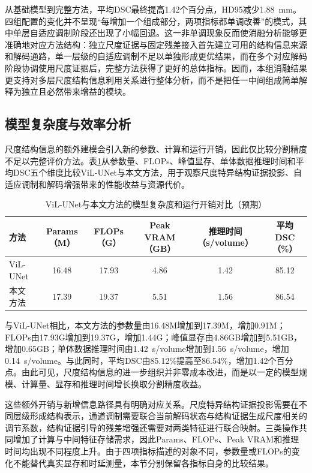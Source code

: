 从基础模型到完整方法，平均DSC最终提高1.42个百分点，HD95减少1.88~mm。四组配置的变化并不呈现“每增加一个组成部分，两项指标都单调改善”的模式，其中单层自适应调制阶段还出现了小幅回退。这一非单调现象反而使消融分析能够更准确地对应方法结构：独立尺度证据与固定残差接入首先建立可用的结构信息来源和解码通路，单一层级的自适应调制不足以单独形成更优结果，而在多个对应解码阶段协调使用尺度证据后，完整方法获得了更好的总体指标。因而，本组消融结果更支持对多层尺度结构信息利用关系进行整体分析，而不是把任一中间组成简单解释为独立且必然带来增益的模块。

\subsection{模型复杂度与效率分析}

尺度结构信息的额外建模会引入新的参数、计算和运行开销，因此仅比较分割精度不足以完整评价方法。表\ref{tab:ch4-efficiency}从参数量、FLOPs、峰值显存、单体数据推理时间和平均DSC五个维度比较ViL-UNet与本文方法，用于观察尺度特异结构证据投影、自适应调制和解码增强带来的性能收益与资源代价。

\begin{table}[htbp]
  \centering
  \caption{ViL-UNet与本文方法的模型复杂度和运行开销对比（预期）}
  \label{tab:ch4-efficiency}
  \begin{tabular}{lccccc}
    \toprule
    方法 & Params（M） & FLOPs（G） & Peak VRAM（GB） & 推理时间（s/volume） & 平均DSC（\%） \\
    \midrule
    ViL-UNet & 16.48 & 17.93 & 4.86 & 1.42 & 85.12 \\
    本文方法 & 17.39 & 19.37 & 5.51 & 1.56 & 86.54 \\
    \bottomrule
  \end{tabular}
\end{table}

与ViL-UNet相比，本文方法的参数量由16.48M增加到17.39M，增加0.91M；FLOPs由17.93G增加到19.37G，增加1.44G；峰值显存由4.86GB增加到5.51GB，增加0.65GB；单体数据推理时间由1.42~s/volume增加到1.56~s/volume，增加0.14~s/volume。与此同时，平均DSC由85.12\%提高至86.54\%，增加1.42个百分点。由此可见，尺度结构信息的进一步组织并非零成本改进，而是以一定的模型规模、计算量、显存和推理时间增长换取分割精度收益。

这些额外开销与新增信息路径具有明确对应关系。尺度特异结构证据投影需要在不同层级形成结构表示，通道调制需要联合当前解码状态与结构证据生成尺度相关的调节系数，结构证据引导的残差增强还需要对两类特征进行联合映射。三类操作共同增加了计算与中间特征存储需求，因此Params、FLOPs、Peak VRAM和推理时间均出现不同程度上升。由于四项指标描述的对象不同，参数量或FLOPs的变化不能替代真实显存和时延测量，本节分别保留各指标自身的比较结果。


